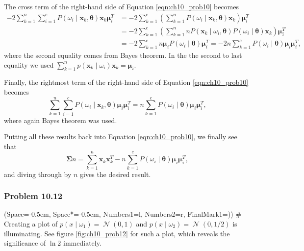 \documentclass[12pt, a4paper]{article}
\newcommand{\listSpace}{-0.5em}%
\newcommand{\vect}[1]{\bm{#1}}
\DeclareMathOperator{\N}{\mathcal{N}}
\begin{document}
{\begin{easylist}[enumerate]
The cross term of the right-hand side of Equation \eqref{eqn:ch10_prob10} becomes
\begin{align*}
	- 2 \sum_{k=1}^{n} \sum_{i=1}^{c} P \left( \omega_i \mid \vect{x}_k, \vect{\theta}\right)  \vect{x}_k \vect{\mu}_i^T 
	& =
	- 2  \sum_{k=1}^{c} \left( \sum_{k=1}^{n} P \left( \omega_i \mid \vect{x}_k, \vect{\theta}\right)  \vect{x}_k \right) \vect{\mu}_i^T \\
	& =
	- 2  \sum_{k=1}^{c} \left( \sum_{k=1}^{n} n P \left(  \vect{x}_k \mid \omega_i , \vect{\theta}\right) P(\omega_i \mid \vect{\theta} ) \vect{x}_k \right) \vect{\mu}_i^T \\
	& =
	- 2  \sum_{k=1}^{c} 
	n \vect{\mu}_i P(\omega_i \mid \vect{\theta})
	 \vect{\mu}_i^T
	 = 
	 -2 n \sum_{k=1}^{c} 
	 P(\omega_i \mid \vect{\theta} ) \vect{\mu}_i
	 \vect{\mu}_i^T,
\end{align*}
where the second equality comes from Bayes theorem. 
In the the second to last equality we used $\sum_{k=1}^{n} p(\vect{x}_k \mid \omega_i) \vect{x}_k = \vect{\mu}_i$.

Finally, the rightmost term of the right-hand side of Equation \eqref{eqn:ch10_prob10} becomes
\begin{equation*}
	\sum_{k=1}^{n} \sum_{i=1}^{c} P \left( \omega_i \mid \vect{x}_k, \vect{\theta}\right)
	\vect{\mu}_i \vect{\mu}_i^T
	=
	n \sum_{k=1}^{c} P \left( \omega_i \mid  \vect{\theta}\right)
	\vect{\mu}_i \vect{\mu}_i^T,
\end{equation*}
where again Bayes theorem was used.

Putting all these results back into Equation \eqref{eqn:ch10_prob10}, we finally see that
\begin{equation*}
	\vect{\Sigma} n
	=
	\sum_{k=1}^{n}
	\vect{x}_k \vect{x}_k^T
	-
	n \sum_{k=1}^{c} P \left( \omega_i \mid  \vect{\theta}\right)
	\vect{\mu}_i \vect{\mu}_i^T,
\end{equation*}
and diving through by $n$ gives the desired result.
\end{easylist}

\subsubsection*{Problem 10.12}
\begin{easylist}[enumerate]
	\ListProperties(Space=\listSpace, Space*=\listSpace, Numbers1=l, Numbers2=r, FinalMark1={)})
	# Creating a plot of $p(x \mid \omega_1) = \N(0, 1)$ and $p(x \mid \omega_2) = \N(0, 1/2)$ is illuminating.
	See figure \ref{fig:ch10_prob12} for such a plot, which reveals the significance of $\ln 2$ immediately.
	

\end{easylist}}
\end{document}
